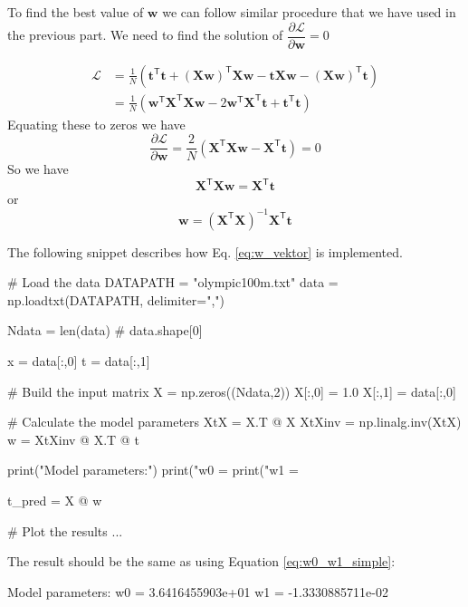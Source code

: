 \documentclass[b5paper,12pt]{article} %
\begin{document}
To find the best value of $\mathbf{w}$ we can follow similar procedure that we have used
in the previous part. We need to find the solution of
$\dfrac{\partial \mathcal{L}}{\partial \mathbf{w}} = 0$

\begin{align}
\mathcal{L} & = \frac{1}{N} \left(
\mathbf{t}^{\mathsf{T}} \mathbf{t} +
\left(\mathbf{Xw}\right)^{\mathsf{T}} \mathbf{Xw} -
\mathbf{t}\mathbf{Xw} -
\left(\mathbf{Xw}\right)^{\mathsf{T}} \mathbf{t}
\right) \\
& = \frac{1}{N} \left(
\mathbf{w}^{\mathsf{T}} \mathbf{X}^{\mathsf{T}} \mathbf{X} \mathbf{w} -
2 \mathbf{w}^{\mathsf{T}} \mathbf{X}^{\mathsf{T}}\mathbf{t} +
\mathbf{t}^{\mathsf{T}} \mathbf{t}
\right)
\end{align}
Equating these to zeros we have
\begin{equation}
\frac{\partial \mathcal{L}}{\partial \mathbf{w}} =
\frac{2}{N} \left( \mathbf{X}^{\mathsf{T}} \mathbf{Xw} - \mathbf{X}^{\mathsf{T}}\mathbf{t} \right) = 0
\end{equation}
So we have
\begin{equation}
\mathbf{X}^{\mathsf{T}} \mathbf{Xw} = \mathbf{X}^{\mathsf{T}} \mathbf{t}
\end{equation}
or
\begin{equation}
\mathbf{w} = \left(\mathbf{X}^{\mathsf{T}}\mathbf{X} \right)^{-1} \mathbf{X}^{\mathsf{T}} \mathbf{t}
\label{eq:w_vektor}
\end{equation}

The following snippet describes how Eq. \eqref{eq:w_vektor} is implemented.
\begin{pythoncode}
# Load the data
DATAPATH = "olympic100m.txt"
data = np.loadtxt(DATAPATH, delimiter=",")
  
Ndata = len(data) # data.shape[0]
  
x = data[:,0]
t = data[:,1]
  
# Build the input matrix
X = np.zeros((Ndata,2))
X[:,0] = 1.0
X[:,1] = data[:,0]
  
# Calculate the model parameters
XtX = X.T @ X
XtXinv = np.linalg.inv(XtX)
w = XtXinv @ X.T @ t
  
print("Model parameters:")
print("w0 = %
print("w1 = %
  
t_pred = X @ w

# Plot the results ...
\end{pythoncode}

The result should be the same as using Equation \eqref{eq:w0_w1_simple}:
\begin{textcode}
Model parameters:
w0 =   3.6416455903e+01
w1 =  -1.3330885711e-02  
\end{textcode}
\end{document}
